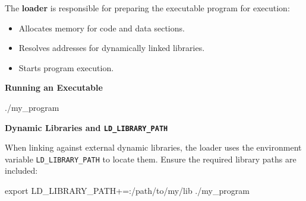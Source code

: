 The \textbf{loader} is responsible for preparing the executable program for execution:
\begin{itemize}
    \item Allocates memory for code and data sections.
    \item Resolves addresses for dynamically linked libraries.
    \item Starts program execution.
\end{itemize}

\textbf{Running an Executable}

\begin{codeblock}[language=bash, numbers=none]
./my_program
\end{codeblock}

\textbf{Dynamic Libraries and \texttt{LD\_LIBRARY\_PATH}}

When linking against external dynamic libraries, the loader uses the environment variable \texttt{LD\_LIBRARY\_PATH} to locate them. Ensure the required library paths are included:

\begin{codeblock}[language=bash, numbers=none]
export LD_LIBRARY_PATH+=:/path/to/my/lib
./my_program
\end{codeblock}
